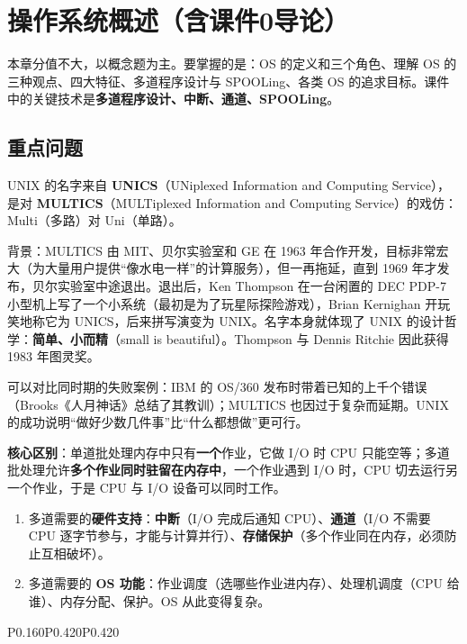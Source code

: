 \section{操作系统概述（含课件0导论）}

本章分值不大，以概念题为主。要掌握的是：OS 的定义和三个角色、理解 OS 的三种观点、四大特征、多道程序设计与 SPOOLing、各类 OS 的追求目标。课件中的关键技术是\textbf{多道程序设计、中断、通道、SPOOLing}。

\subsection{重点问题}

UNIX 的名字来自 \textbf{UNICS}（UNiplexed Information and Computing Service），是对 \textbf{MULTICS}（MULTiplexed Information and Computing Service）的戏仿：Multi（多路）对 Uni（单路）。

背景：MULTICS 由 MIT、贝尔实验室和 GE 在 1963 年合作开发，目标非常宏大（为大量用户提供“像水电一样”的计算服务），但一再拖延，直到 1969 年才发布，贝尔实验室中途退出。退出后，Ken Thompson 在一台闲置的 DEC PDP-7 小型机上写了一个小系统（最初是为了玩星际探险游戏），Brian Kernighan 开玩笑地称它为 UNICS，后来拼写演变为 UNIX。名字本身就体现了 UNIX 的设计哲学：\textbf{简单、小而精}（small is beautiful）。Thompson 与 Dennis Ritchie 因此获得 1983 年图灵奖。

可以对比同时期的失败案例：IBM 的 OS/360 发布时带着已知的上千个错误（Brooks《人月神话》总结了其教训）；MULTICS 也因过于复杂而延期。UNIX 的成功说明“做好少数几件事”比“什么都想做”更可行。

\textbf{核心区别}：单道批处理内存中只有\textbf{一个}作业，它做 I/O 时 CPU 只能空等；多道批处理允许\textbf{多个作业同时驻留在内存中}，一个作业遇到 I/O 时，CPU 切去运行另一个作业，于是 CPU 与 I/O 设备可以同时工作。
\begin{enumerate}
    \item 多道需要的\textbf{硬件支持}：\textbf{中断}（I/O 完成后通知 CPU）、\textbf{通道}（I/O 不需要 CPU 逐字节参与，才能与计算并行）、\textbf{存储保护}（多个作业同在内存，必须防止互相破坏）。
    \item 多道需要的 \textbf{OS 功能}：作业调度（选哪些作业进内存）、处理机调度（CPU 给谁）、内存分配、保护。OS 从此变得复杂。
\end{enumerate}

\begin{btab}{P{0.160}P{0.420}P{0.420}}
\end{btab}

